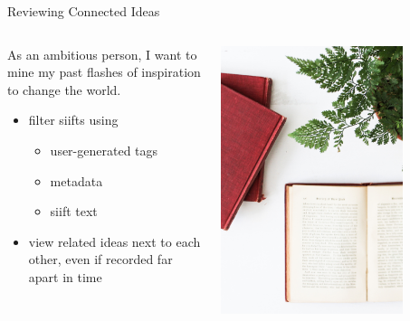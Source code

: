 \begin{frame}{Reviewing Connected Ideas}
\begin{columns}
\begin{column}{0.5\textwidth}
As an ambitious person, I want to mine my past flashes of inspiration to change the world. 
\begin{itemize}
\item filter siifts using
\begin{itemize}
  \item user-generated tags
  \item metadata 
  \item siift text
\end{itemize}
\item view related ideas next to each other, even if recorded far apart in time
\end{itemize}
\end{column}
\begin{column}{0.5\textwidth}  %
    \begin{center}
     \includegraphics[width=0.75\textwidth]{img/DeathtoStock_Clementine2}
     \end{center}
\end{column}
\end{columns}
\end{frame}

